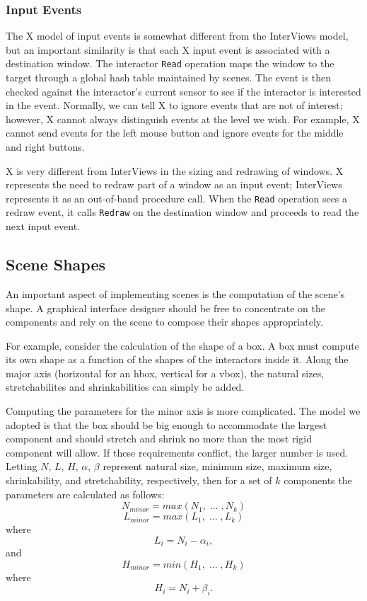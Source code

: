 \subsubsection{Input Events}
The X model of input events is somewhat different from the InterViews model,
but an important similarity is that each X input event is
associated with a destination window.
The interactor {\tt Read} operation maps the window to the target
through a global hash table maintained by scenes.
The event is then checked against the interactor's current sensor
to see if the interactor is interested in the event.
Normally, we can tell X to ignore events that are not of interest;
however, X cannot always distinguish events at the level we wish.
For example, X cannot send events for the left mouse button and
ignore events for the middle and right buttons.

X is very different from InterViews in the sizing and redrawing of windows.
X represents the need to redraw part of a window as an input event;
InterViews represents it as an out-of-band procedure call.
When the {\tt Read} operation sees a redraw event,
it calls {\tt Redraw} on the destination window and
proceeds to read the next input event.

\subsection{Scene Shapes}
An important aspect of implementing scenes is the computation of
the scene's shape.  A graphical interface designer should be free
to concentrate on the components and rely on the scene to compose
their shapes appropriately.

For example, consider the calculation of the shape of a box.
A box must compute its own shape as a function of the shapes
of the interactors inside it.
Along the major axis (horizontal for an hbox, vertical for a vbox),
the natural sizes, stretchabilites and shrinkabilities can simply be added.

Computing the parameters for the
minor axis is more complicated.
The model we adopted is that the box should be big enough to accommodate the
largest component and should stretch and shrink no more than the most rigid
component will allow.  If these requirements conflict, the larger number is
used.  Letting $N$, $L$, $H$, $\alpha$, $\beta$
represent natural size, minimum size, maximum size, shrinkability, and
stretchability, respectively, then for a set of $k$ components 
the parameters are calculated as follows:
\[N_{minor} = max(N_{1}, \;\ldots\;, N_{k})\]
\[L_{minor} = max(L_{1}, \;\ldots\;, L_{k})\]
where
\[L_{i} = N_{i} - \alpha_{i},\]
and
\[H_{minor} = min(H_{1}, \;\ldots\;, H_{k})\]
where
\[H_{i} = N_{i} + \beta_{i}.\]

